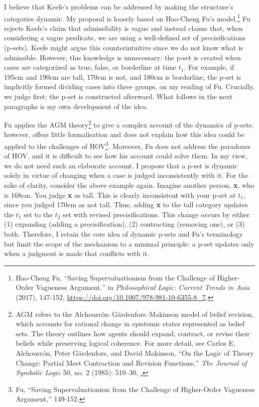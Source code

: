 I believe that Keefe's problems can be addressed by making the
structure's categories dynamic. My proposal is loosely based on
Hao-Cheng Fu's model.\footnote{Hao-Cheng Fu, ``Saving Supervaluationism
  from the Challenge of Higher-Order Vagueness Argument,'' in
  \emph{Philosophical Logic: Current Trends in Asia} (2017), 147-152,
  \url{https://doi.org/10.1007/978-981-10-6355-8_7}.} Fu rejects Keefe's
claim that admissibility is vague and instead claims that, when
considering a vague predicate, we are using a well-defined set of
precisifications (p-sets). Keefe might argue this counterintuitive since
we do not know what is admissible. However, this knowledge is
unnecessary: the p-set is created when cases are categorized as true,
false, or borderline at time \(t_{1}\). For example, if 195cm and 190cm
are tall, 170cm is not, and 180cm is borderline, the p-set is implicitly
formed dividing cases into three groups, on my reading of Fu. Crucially,
we judge first; the p-set is constructed afterward. What follows in the
next paragraphs is my own development of the idea.

Fu applies the AGM theory\footnote{AGM refers to the
  Alchourrón--Gärdenfors--Makinson model of belief revision, which
  accounts for rational change in epistemic states represented as belief
  sets. The theory outlines how agents should expand, contract, or
  revise their beliefs while preserving logical coherence. For more
  detail, see Carlos E. Alchourrón, Peter Gärdenfors, and David
  Makinson, ``On the Logic of Theory Change: Partial Meet Contraction
  and Revision Functions,'' \emph{The Journal of Symbolic Logic} 50, no.
  2 (1985): 510--30,
  \href{https://doi.org/10.2307/2274239}.}
to give a complex account of the dynamics of p-sets; however, offers
little formalisation and does not explain how this idea could be applied
to the challenges of HOV\footnote{Fu, ``Saving Supervaluationism from
  the Challenge of Higher-Order Vagueness Argument,'' 149-152.}.
Moreover, Fu does not address the paradoxes of HOV, and it is difficult
to see how his account could solve them. In my view, we do not need such
an elaborate account. I propose that a p-set is dynamic solely in virtue
of changing when a case is judged inconsistently with it. For the sake
of clarity, consider the above example again. Imagine another person,
\textbf{x}, who is 168cm. You judge \textbf{x} as tall. This is clearly
inconsistent with your p-set at \(t_{1}\), since you judged 170cm as not
tall. Thus, adding \textbf{x} to the tall category updates the \(t_{1}\)
set to the \(t_{2}\) set with revised precisifications. This change
occurs by either (1) expanding (adding a precisification), (2)
contracting (removing one), or (3) both. Therefore, I retain the core
idea of dynamic p-sets and Fu's terminology but limit the scope of the
mechanism to a minimal principle: a p-set updates only when a judgment
is made that conflicts with it.

